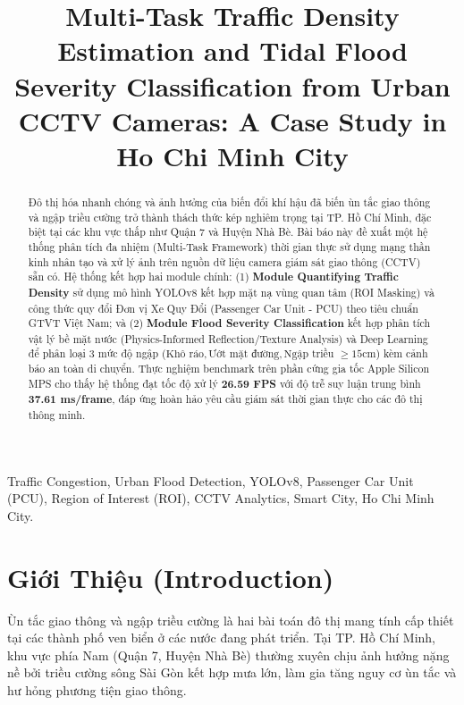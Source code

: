 \documentclass[conference]{IEEEtran}
\begin{document}
\title{Multi-Task Traffic Density Estimation and Tidal Flood Severity Classification from Urban CCTV Cameras: A Case Study in Ho Chi Minh City}

\author{
}

\maketitle

\begin{abstract}
Đô thị hóa nhanh chóng và ảnh hưởng của biến đổi khí hậu đã biến ùn tắc giao thông và ngập triều cường trở thành thách thức kép nghiêm trọng tại TP. Hồ Chí Minh, đặc biệt tại các khu vực thấp như Quận 7 và Huyện Nhà Bè. Bài báo này đề xuất một hệ thống phân tích đa nhiệm (Multi-Task Framework) thời gian thực sử dụng mạng thần kinh nhân tạo và xử lý ảnh trên nguồn dữ liệu camera giám sát giao thông (CCTV) sẵn có. Hệ thống kết hợp hai module chính: (1) \textbf{Module Quantifying Traffic Density} sử dụng mô hình YOLOv8 kết hợp mặt nạ vùng quan tâm (ROI Masking) và công thức quy đổi Đơn vị Xe Quy Đổi (Passenger Car Unit - PCU) theo tiêu chuẩn GTVT Việt Nam; và (2) \textbf{Module Flood Severity Classification} kết hợp phân tích vật lý bề mặt nước (Physics-Informed Reflection/Texture Analysis) và Deep Learning để phân loại 3 mức độ ngập ($\text{Khô ráo}, \text{Ướt mặt đường}, \text{Ngập triều } \ge 15\text{cm}$) kèm cảnh báo an toàn di chuyển. Thực nghiệm benchmark trên phần cứng gia tốc Apple Silicon MPS cho thấy hệ thống đạt tốc độ xử lý \textbf{26.59 FPS} với độ trễ suy luận trung bình \textbf{37.61 ms/frame}, đáp ứng hoàn hảo yêu cầu giám sát thời gian thực cho các đô thị thông minh.
\end{abstract}

\begin{IEEEkeywords}
Traffic Congestion, Urban Flood Detection, YOLOv8, Passenger Car Unit (PCU), Region of Interest (ROI), CCTV Analytics, Smart City, Ho Chi Minh City.
\end{IEEEkeywords}

\section{Giới Thiệu (Introduction)}
Ùn tắc giao thông và ngập triều cường là hai bài toán đô thị mang tính cấp thiết tại các thành phố ven biển ở các nước đang phát triển. Tại TP. Hồ Chí Minh, khu vực phía Nam (Quận 7, Huyện Nhà Bè) thường xuyên chịu ảnh hưởng nặng nề bởi triều cường sông Sài Gòn kết hợp mưa lớn, làm gia tăng nguy cơ ùn tắc và hư hỏng phương tiện giao thông.
\end{document}
